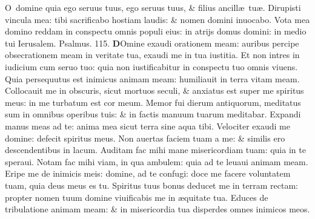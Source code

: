 \documentclass[a5paper,10pt]{book}
\def\ae{æ}
\begin{document}
\begin{multicols*}{2}
\newline \color{red} O\color{black}\ domine quia ego seruus tuus, ego seruus tuus, \& filius ancill\ae \ tu\ae .
\newline \color{red} D\color{black}irupisti vincula mea: tibi sacrificabo hostiam laudis: \& nomen domini inuocabo.
\newline \color{red} V\color{black}ota mea domino reddam in conspectu omnis populi eius: in atrijs domus domini: in medio tui Ierusalem.
\newline \color{red} Psalmus. 115. \color{black}
\vspace{-1em}
\lettrine[lines=2]{\bfseries \color{red} D}{}Omine exaudi orationem meam: auribus percipe obsecrationem meam in veritate tua, exaudi me in tua iustitia.
\newline \color{red} E\color{black}t non intres in iudicium cum seruo tuo: quia non iustificabitur in conspectu tuo omnis viuens.
\newline \color{red} Q\color{black}uia persequutus est inimicus animam meam: humiliauit in terra vitam meam.
\newline \color{red} C\color{black}ollocauit me in obscuris, sicut mortuos seculi, \& anxiatus est super me spiritus meus: in me turbatum est cor meum.
\newline \color{red} M\color{black}emor fui dierum antiquorum, meditatus sum in omnibus operibus tuis: \& in factis manuum tuarum meditabar.
\newline \color{red} E\color{black}xpandi manus meas ad te: anima mea sicut terra sine aqua tibi.
\newline \color{red} V\color{black}elociter exaudi me domine: defecit spiritus meus.
\newline \color{red} N\color{black}on auertas faciem tuam a me: \& similis ero descendentibus in lacum.
\newline \color{red} A\color{black}uditam fac mihi mane misericordiam tuam: quia in te speraui.
\newline \color{red} N\color{black}otam fac mihi viam, in qua ambulem: quia ad te leuaui animam meam.
\newline \color{red} E\color{black}ripe me de inimicis meis: domine, ad te confugi: doce me facere voluntatem tuam, quia deus meus es tu.
\newline \color{red} S\color{black}piritus tuus bonus deducet me in terram rectam: propter nomen tuum domine viuificabis me in \ae quitate tua.
\newline \color{red} E\color{black}duces de tribulatione animam meam: \& in misericordia tua disperdes omnes inimicos meos.%

\end{multicols*}
\end{document}
